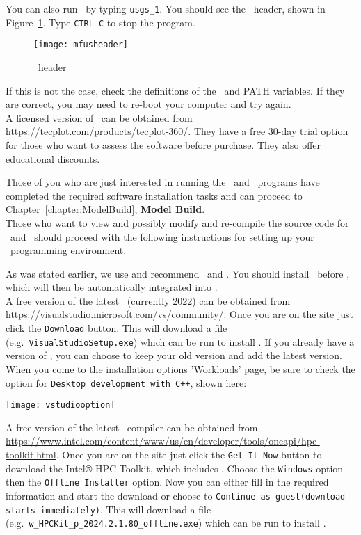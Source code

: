 You can also run \mfus\ by typing \texttt{usgs\_1}.  You should see the \mfus\ header, shown in Figure~\ref{fig:mfusheader}. Type \texttt{CTRL C} to stop the program.
\begin{figure}
    \texttt{[image: mfusheader]}
    \caption{\mfus\ header}
    \label{fig:mfusheader}
\end{figure}

If this is not the case, check the definitions of the \bin\ and PATH variables.  If they are correct, you may need to re-boot your computer and try again. \\

A licensed version of \tecplot\ can be obtained from \url{https://tecplot.com/products/tecplot-360/}.  They have a free 30-day trial option for those who want to assess the software before purchase.  They also offer educational discounts.

Those of you who are just interested in running the \mut\ and \mfus\ programs have completed the required  software installation tasks and can proceed to Chapter~\ref{chapter:ModelBuild}, \textbf{Model Build}. \\

Those who want to view and possibly modify and re-compile the source code for \mut\ and \mfus\ should proceed with the following instructions for setting up your \windows\ programming environment.

As was stated earlier, we use and recommend \vstudio\ and \ifort. You should install \vstudio\ before \ifort, which will then be automatically integrated into \vstudio. \\

A free version of the latest \vstudio\ (currently 2022) can be obtained from \url{https://visualstudio.microsoft.com/vs/community/}. Once you are on the site just click the \texttt{Download} button.  This will download a file (e.g.\ \texttt{VisualStudioSetup.exe}) which can be run to install \vstudio.  If you already have a version of \vstudio, you can choose to keep your old version and add the latest version.  When you come to the installation options 'Workloads' page, be sure to check the option for \texttt{Desktop development with C++}, shown here:

\texttt{[image: vstudiooption]}

A free version of the latest \ifort\ compiler can be obtained from \url{https://www.intel.com/content/www/us/en/developer/tools/oneapi/hpc-toolkit.html}.
Once you are on the site just click the \texttt{Get It Now} button to download the Intel® HPC Toolkit, which includes \ifort.  Choose the \texttt{Windows} option then the \texttt{Offline Installer} option. Now you can either fill in the required information and start the download or choose to \texttt{Continue as guest(download starts immediately)}.  This will download a file (e.g.\ \texttt{w\_HPCKit\_p\_2024.2.1.80\_offline.exe}) which can be run to install \ifort.

